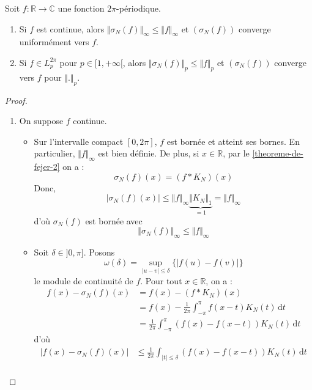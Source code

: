 
  \begin{theorem}[Fejér]
    Soit $f : \mathbb{R} \rightarrow \mathbb{C}$ une fonction $2\pi$-périodique.
    \begin{enumerate}[label=(\roman*)]
      \item Si $f$ est continue, alors $\Vert \sigma_N(f) \Vert_\infty \leq \Vert f \Vert_\infty$ et $(\sigma_N(f))$ converge uniformément vers $f$.
      \item Si $f \in L_p^{2\pi}$ pour $p \in [1,+\infty[$, alors $\Vert \sigma_N(f) \Vert_p \leq \Vert f \Vert_p$ et $(\sigma_N(f))$ converge vers $f$ pour $\Vert . \Vert_p$.
    \end{enumerate}
  \end{theorem}

  \begin{proof}
    \begin{enumerate}[label=(\roman*)]
      \item On suppose $f$ continue.
      \begin{itemize}
        \item Sur l'intervalle compact $[0, 2\pi]$, $f$ est bornée et atteint ses bornes. En particulier, $\Vert f \Vert_\infty$ est bien définie. De plus, si $x \in \mathbb{R}$, par le \cref{theoreme-de-fejer-2} on a :
        \[ \sigma_N(f)(x) = (f * K_N)(x) \]
        Donc,
        \[ \vert \sigma_N(f)(x) \vert \leq \Vert f \Vert_\infty \underbrace{\Vert K_N \Vert_1}_{=1} = \Vert f \Vert_\infty \]
        d'où $\sigma_N(f)$ est bornée avec
        \[ \Vert \sigma_N(f) \Vert_\infty \leq \Vert f \Vert_\infty \]
        \item Soit $\delta \in ]0,\pi]$. Posons
        \[ \omega(\delta) = \sup_{\vert u - v \vert \leq \delta} \{ \vert f(u) - f(v) \vert \} \]
        le module de continuité de $f$. Pour tout $x \in \mathbb{R}$, on a :
        \begin{align*}
          f(x) - \sigma_N(f)(x) &= f(x) - (f * K_N)(x) \\
          &= f(x) - \frac{1}{2\pi} \int_{-\pi}^{\pi} f(x-t) K_N(t) \, \mathrm{d}t \\
          &= \frac{1}{2\pi} \int_{-\pi}^{\pi} (f(x) - f(x-t)) K_N(t) \, \mathrm{d}t \tag{*}
        \end{align*}
        d'où
        \begin{align*}
          \vert f(x) - \sigma_N(f)(x) \vert &\leq \frac{1}{2\pi} \int_{\vert t \vert \leq \delta} (f(x) - f(x-t)) K_N(t) \, \mathrm{d}t \\

\end{align*}
\end{itemize}
\end{enumerate}
\end{proof}
